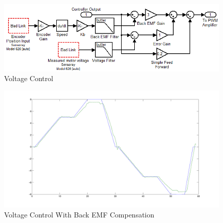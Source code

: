 


\begin{figure}[htp]
    \centering
    \includegraphics[scale=0.7]{images/VoltageControl.PNG}
    \caption{Voltage Control}
    \label{fig:simulinkvoltagecontrol}
\end{figure}

\begin{figure}[htp]
    \centering
    \includegraphics[width=.9\textwidth]{images/BackEMFControl.pdf}
    \caption{Voltage Control With Back EMF Compensation}
    \label{fig:backemf}
\end{figure}
